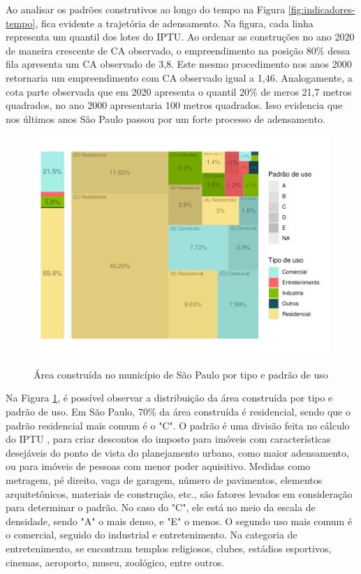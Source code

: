 \begin{apendicesenv}
Ao analisar os padrões construtivos ao longo do tempo na Figura \ref{fig:indicadores-tempo}, fica evidente a trajetória de adensamento. Na figura, cada linha representa um quantil dos lotes do IPTU. Ao ordenar as construções no ano 2020 de maneira crescente de CA observado, o empreendimento na posição 80\% dessa fila apresenta um CA observado de 3,8. Este mesmo procedimento nos anos 2000 retornaria um empreendimento com CA observado igual a 1,46. Analogamente, a cota parte observada que em 2020 apresenta o quantil 20\% de meros 21,7 metros quadrados, no ano 2000 apresentaria 100 metros quadrados. Isso evidencia que nos últimos anos São Paulo passou por um forte processo de adensamento.


\clearpage

\begin{figure}
    \centering
    \caption{Área construída no município de São Paulo por tipo e padrão de uso}
    \includegraphics[width = .8\linewidth]{figuras/tree_area_construida.pdf}
    \label{fig:area_construida}
\end{figure}

Na Figura \ref{fig:area_construida}, é possível observar a distribuição da área construída por tipo e padrão de uso. Em São Paulo, 70\% da área construída é residencial, sendo que o padrão residencial mais comum é o "C". O padrão é uma divisão feita no cálculo do IPTU \cite{lei10235_1986}, para criar descontos do imposto para imóveis com características desejáveis do ponto de vista do planejamento urbano, como maior adensamento, ou para imóveis de pessoas com menor poder aquisitivo. Medidas como metragem, pé direito, vaga de garagem, número de pavimentos, elementos arquitetônicos, materiais de construção, etc., são fatores levados em consideração para determinar o padrão. No caso do "C", ele está no meio da escala de densidade, sendo "A" o mais denso, e "E" o menos. O segundo uso mais comum é o comercial, seguido do industrial e entretenimento. Na categoria de entretenimento, se encontram templos religiosos, clubes, estádios esportivos, cinemas, aeroporto, museu, zoológico, entre outros.







\end{apendicesenv}
